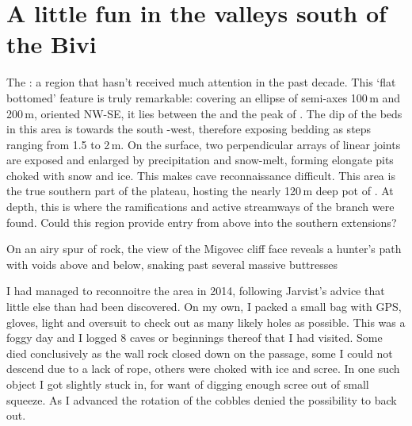 \section{A little fun in the valleys south of the Bivi}


The : a region that hasn't received much attention in the past decade. This `flat bottomed' feature is truly remarkable: covering an ellipse of semi-axes 100\,m and 200\,m, oriented NW-SE, it lies between the  and the peak of . The dip of the beds in this area is towards the south -west, therefore exposing bedding as steps ranging from 1.5 to 2\,m. On the surface, two perpendicular arrays of linear joints are exposed and enlarged by precipitation and snow-melt, forming elongate pits choked with snow and ice. This makes cave reconnaissance difficult. This area is the true southern part of the plateau, hosting the nearly 120\,m deep pot of .  At depth, this is where the ramifications and active streamways of the  branch were found. Could this region provide entry from above into the southern extensions?

\begin{marginfigure}
\centering
{}
\label{migface}
\caption{On an airy spur of rock, the view of the Migovec cliff face reveals a hunter's path with voids above and below, snaking past several massive buttresses }
\end{marginfigure}

I had managed to reconnoitre the area in 2014, following Jarvist's advice that little else than  had been discovered. On my own, I packed a small bag with GPS, gloves, light and oversuit to check out as many likely holes as possible. This was a foggy day and I logged 8 caves or beginnings thereof that I had visited. Some died conclusively as the wall rock closed down on the passage, some I could not descend due to a lack of rope, others were choked with ice and scree. In one such object I got slightly stuck in, for want of digging enough scree out of small squeeze. As I advanced the rotation of the cobbles denied the possibility to back out. 

